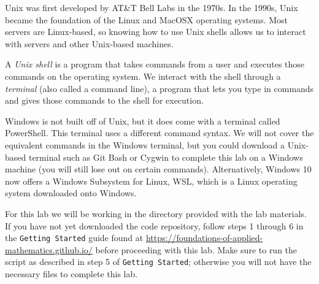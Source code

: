 \label{lab:Shell}


Unix was first developed by AT\&T Bell Labs in the 1970s.
In the 1990s, Unix became the foundation of the Linux and MacOSX operating systems.
Most servers are Linux-based, so knowing how to use Unix shells allows us to interact with servers and other Unix-based machines.

A \emph{Unix shell} is a program that takes commands from a user and executes those commands on the operating system.
We interact with the shell through a \emph{terminal} (also called a command line), a program that lets you type in commands and gives those commands to the shell for execution.

\begin{info} %
Windows is not built off of Unix, but it does come with a terminal called PowerShell.
This terminal uses a different command syntax.
We will not cover the equivalent commands in the Windows terminal, but you could download a Unix-based terminal such as Git Bash or Cygwin to complete this lab on a Windows machine (you will still lose out on certain commands).
Alternatively, Windows 10 now offers a Windows Subsystem for Linux, WSL, which is a Linux operating system downloaded onto Windows.
\end{info}

\begin{info}
For this lab we will be working in the  directory provided with the lab materials.
If you have not yet downloaded the code repository, follow steps 1 through 6 in the \texttt{Getting Started} guide found at \url{https://foundations-of-applied-mathematics.github.io/} before proceeding with this lab.
Make sure to run the  script as described in step 5 of \texttt{Getting Started}; otherwise you will not have the necessary files to complete this lab.
\end{info}

